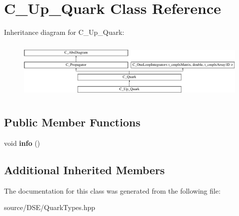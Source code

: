 \hypertarget{class_c___up___quark}{\section{C\-\_\-\-Up\-\_\-\-Quark Class Reference}
\label{class_c___up___quark}
}
Inheritance diagram for C\-\_\-\-Up\-\_\-\-Quark\-:\begin{figure}[H]
\begin{center}
\leavevmode
\includegraphics[height=2.871795cm]{class_c___up___quark}
\end{center}
\end{figure}
\subsection*{Public Member Functions}
\begin{DoxyCompactItemize}
\item 
\hypertarget{class_c___up___quark_a37b6df91793cb955f4d66819346121a6}{void {\bfseries info} ()}\label{class_c___up___quark_a37b6df91793cb955f4d66819346121a6}

\end{DoxyCompactItemize}
\subsection*{Additional Inherited Members}


The documentation for this class was generated from the following file\-:\begin{DoxyCompactItemize}
\item 
source/\-D\-S\-E/Quark\-Types.\-hpp\end{DoxyCompactItemize}
